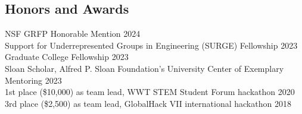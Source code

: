 \documentclass[margin,line]{res}
\newenvironment{list1}{
  \begin{list}{\ding{113}}{%
      \setlength{\itemsep}{0in}
      \setlength{\parsep}{0in} \setlength{\parskip}{0in}
      \setlength{\topsep}{0in} \setlength{\partopsep}{0in} 
      \setlength{\leftmargin}{0.17in}}}{\end{list}}
\begin{document}
\begin{resume}






  \section{\sc Honors and Awards}

  NSF GRFP Honorable Mention \hfill 2024 \\
  Support for Underrepresented Groups in Engineering (SURGE) Fellowship \hfill 2023 \\
  Graduate College Fellowship \hfill 2023 \\
  Sloan Scholar, Alfred P. Sloan Foundation's University Center of Exemplary Mentoring \hfill 2023 \\
  1st place (\$10,000) as team lead, WWT STEM Student Forum hackathon \hfill 2020 \\
  3rd place (\$2,500) as team lead, GlobalHack VII international hackathon \hfill 2018 \\


\end{resume}
\end{document}
